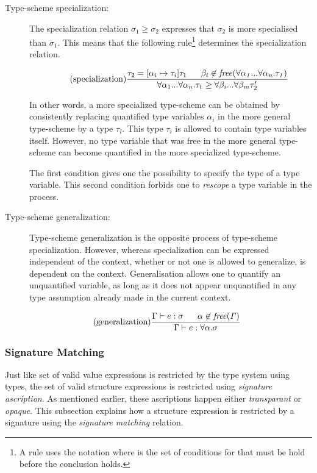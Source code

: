 \begin{description}
\item[Type-scheme specialization:]
The specialization relation $\sigma_{1} \geq \sigma_{2}$ expresses that $\sigma_{2}$ is more specialised than $\sigma_{1}$. This means that the following rule\footnote{A rule uses the notation  where  is the set of conditions for that must be hold before the conclusion holds.} determines the specialization relation.
%

\[
\tag{specialization}
\frac{\tau_{2}=[\alpha_{i} \mapsto \tau_{i}]\tau_{1} \;\;\;\;\;\; \beta_{i} \not\in\mathit{free(\forall\alpha_{1}...\forall \alpha_{n}.\tau_{1})}}
{\forall\alpha_{1}...\forall\alpha_{n}.\tau_{1}\geq \forall \beta_{i}...\forall \beta_{m}\tau_{2}'}
\]

In other words, a more specialized type-scheme can be obtained by consistently replacing quantified type variables $\alpha_{i}$ in the more general type-scheme by a type $\tau_{i}$.
This type $\tau_{i}$ is allowed to contain type variables itself.
However, no type variable that was free in the more general type-scheme can become quantified in the more specialized type-scheme.

The first condition gives one the possibility to specify the type of a type variable. This second condition forbids one to \emph{rescope} a type variable in the process.

\item[Type-scheme generalization:]
Type-scheme generalization is the opposite process of type-scheme specialization. However, whereas specialization can be expressed independent of the context, whether or not one is allowed to generalize, is dependent on the context. Generalisation allows one to quantify an unquantified variable, as long as it does not appear unquantified in any type assumption already made in the current context.
\end{description}

\[
\tag{generalization}
\frac{\Gamma \vdash e:\sigma \;\;\;\;\;\; \alpha \not\in \mathit{free(\Gamma)}}{\Gamma \vdash e : \forall \alpha . \sigma}
\]

\subsubsection{Signature Matching}
\label{sec:StructuralTyping}
Just like set of valid value expressions  is restricted by the type system using types, the set of valid structure expressions is restricted using \emph{signature ascription}. As mentioned earlier, these ascriptions happen either \emph{transparant} or \emph{opaque}.
This subsection explains how a structure expression is restricted by a signature using the \emph{signature matching} relation.

